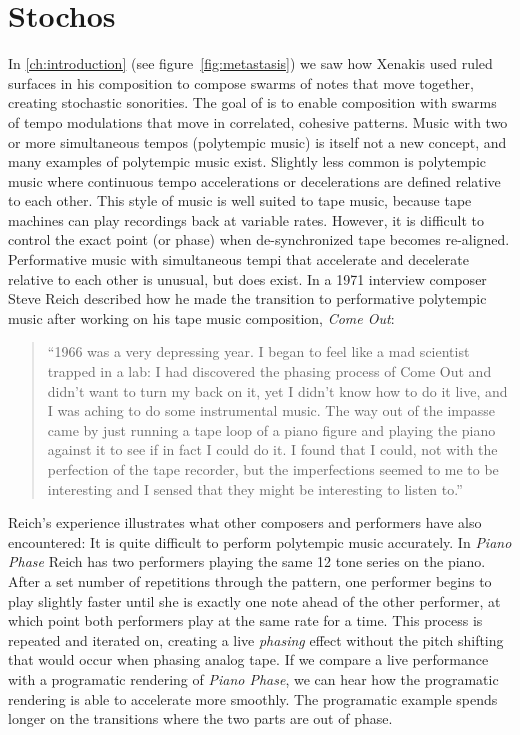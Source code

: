 \section{Stochos}
\label{sec:polytempic-stochos}
In \autoref{ch:introduction} (see figure~\ref{fig:metastasis}) we saw
how Xenakis used ruled surfaces in his composition to compose swarms
of notes that move together, creating stochastic sonorities. The goal
of \polytempic is to enable composition with swarms of tempo
modulations that move in correlated, cohesive patterns. Music with two
or more simultaneous tempos (polytempic music) is itself not a new
concept, and many examples of polytempic music
exist.\cite{Greschak2003} Slightly less common is polytempic music
where continuous tempo accelerations or decelerations are defined
relative to each other. This style of music is well suited to tape
music, because tape machines can play recordings back at variable
rates. However, it is difficult to control the exact point (or phase)
when de-synchronized tape becomes re-aligned. Performative music with
simultaneous tempi that accelerate and decelerate relative to each
other is unusual, but does exist. In a 1971 interview composer Steve
Reich described how he made the transition to performative polytempic
music after working on his tape music composition, \textit{Come Out}:
\begin{quotation}
  ``1966 was a very depressing year. I began to feel like a mad
  scientist trapped in a lab: I had discovered the phasing process
  of Come Out and didn't want to turn my back on it, yet I didn't know
  how to do it live, and I was aching to do some instrumental
  music. The way out of the impasse came by just running a tape loop
  of a piano figure and playing the piano against it to see if in fact
  I could do it. I found that I could, not with the perfection of the
  tape recorder, but the imperfections seemed to me to be interesting
  and I sensed that they might be interesting to listen to.''\cite{Nyman2015}
\end{quotation}
Reich's experience illustrates what other composers and performers
have also encountered: It is quite difficult to perform polytempic
music accurately. In \textit{Piano Phase} Reich has two performers
playing the same 12 tone series on the piano. After a set number of
repetitions through the pattern, one performer begins to play slightly
faster until she is exactly one note ahead of the other performer, at
which point both performers play at the same rate for a time. This
process is repeated and iterated on, creating a live \emph{phasing}
effect without the pitch shifting that would occur when phasing analog
tape. If we compare a live performance\cite{Huisman1989} with a
programatic rendering\cite{Chen2014} of \textit{Piano Phase}, we can
hear how the programatic rendering is able to accelerate more
smoothly. The programatic example spends longer on the transitions
where the two parts are out of phase.

